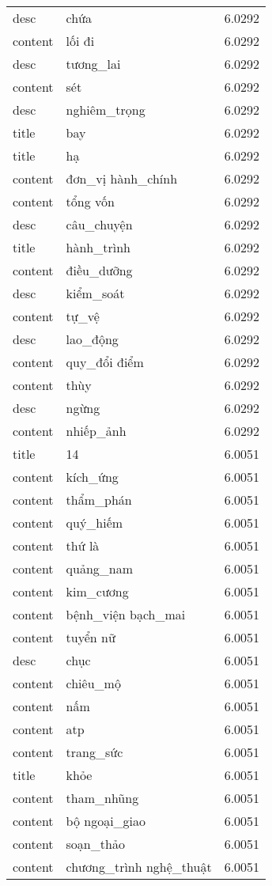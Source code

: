 \documentclass{article}
\begin{document}
\begin{tabular}{lll}
desc & chứa & 6.0292\\
content & lối đi & 6.0292\\
desc & tương\_lai & 6.0292\\
content & sét & 6.0292\\
desc & nghiêm\_trọng & 6.0292\\
title & bay & 6.0292\\
title & hạ & 6.0292\\
content & đơn\_vị hành\_chính & 6.0292\\
content & tổng vốn & 6.0292\\
desc & câu\_chuyện & 6.0292\\
title & hành\_trình & 6.0292\\
content & điều\_dưỡng & 6.0292\\
desc & kiểm\_soát & 6.0292\\
content & tự\_vệ & 6.0292\\
desc & lao\_động & 6.0292\\
content & quy\_đổi điểm & 6.0292\\
content & thùy & 6.0292\\
desc & ngừng & 6.0292\\
content & nhiếp\_ảnh & 6.0292\\
title & 14 & 6.0051\\
content & kích\_ứng & 6.0051\\
content & thẩm\_phán & 6.0051\\
content & quý\_hiếm & 6.0051\\
content & thứ là & 6.0051\\
content & quảng\_nam & 6.0051\\
content & kim\_cương & 6.0051\\
content & bệnh\_viện bạch\_mai & 6.0051\\
content & tuyển nữ & 6.0051\\
desc & chục & 6.0051\\
content & chiêu\_mộ & 6.0051\\
content & nấm & 6.0051\\
content & atp & 6.0051\\
content & trang\_sức & 6.0051\\
title & khỏe & 6.0051\\
content & tham\_nhũng & 6.0051\\
content & bộ ngoại\_giao & 6.0051\\
content & soạn\_thảo & 6.0051\\
content & chương\_trình nghệ\_thuật & 6.0051\\

\end{tabular}
\end{document}
